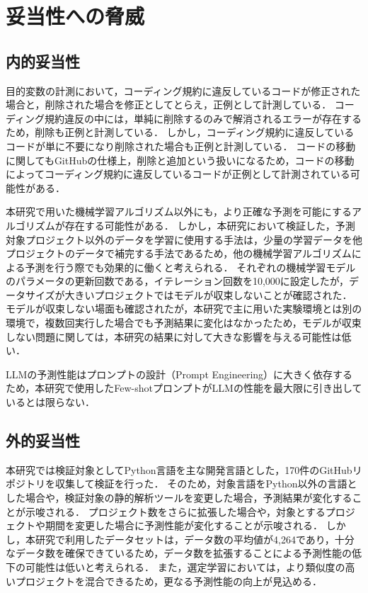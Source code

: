 \documentclass[11pt]{jreport}
\begin{document}
\chapter{妥当性への脅威}\label{chap:heuristic}



\section{内的妥当性}

目的変数の計測において，コーディング規約に違反しているコードが修正された場合と，削除された場合を修正としてとらえ，正例として計測している．
コーディング規約違反の中には，単純に削除するのみで解消されるエラーが存在するため，削除も正例と計測している．
しかし，コーディング規約に違反しているコードが単に不要になり削除された場合も正例と計測している．
コードの移動に関してもGitHubの仕様上，削除と追加という扱いになるため，コードの移動によってコーディング規約に違反しているコードが正例として計測されている可能性がある．

本研究で用いた機械学習アルゴリズム以外にも，より正確な予測を可能にするアルゴリズムが存在する可能性がある．
しかし，本研究において検証した，予測対象プロジェクト以外のデータを学習に使用する手法は，少量の学習データを他プロジェクトのデータで補完する手法であるため，他の機械学習アルゴリズムによる予測を行う際でも効果的に働くと考えられる．
それぞれの機械学習モデルのパラメータの更新回数である，イテレーション回数を10,000に設定したが，データサイズが大きいプロジェクトではモデルが収束しないことが確認された．
モデルが収束しない場面も確認されたが，本研究で主に用いた実験環境とは別の環境で，複数回実行した場合でも予測結果に変化はなかったため，モデルが収束しない問題に関しては，本研究の結果に対して大きな影響を与える可能性は低い．

LLMの予測性能はプロンプトの設計（Prompt Engineering）に大きく依存するため，本研究で使用したFew-shotプロンプトがLLMの性能を最大限に引き出しているとは限らない．

\section{外的妥当性}

本研究では検証対象としてPython言語を主な開発言語とした，170件のGitHubリポジトリを収集して検証を行った．
そのため，対象言語をPython以外の言語とした場合や，検証対象の静的解析ツールを変更した場合，予測結果が変化することが示唆される．
プロジェクト数をさらに拡張した場合や，対象とするプロジェクトや期間を変更した場合に予測性能が変化することが示唆される．
しかし，本研究で利用したデータセットは，データ数の平均値が4,264であり，十分なデータ数を確保できているため，データ数を拡張することによる予測性能の低下の可能性は低いと考えられる．
また，選定学習においては，より類似度の高いプロジェクトを混合できるため，更なる予測性能の向上が見込める．
\end{document}
